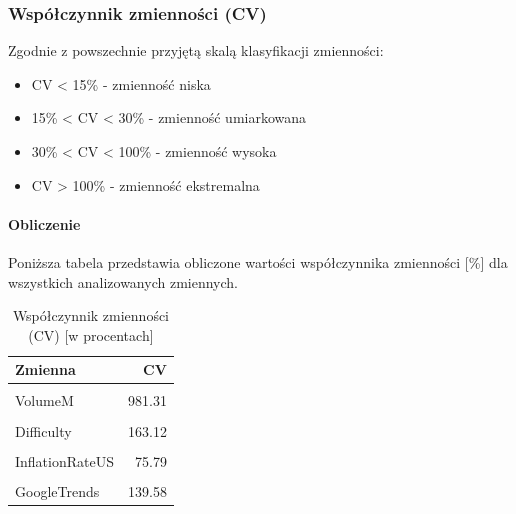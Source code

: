 \documentclass[
  11pt,
]{article}
\providecommand{\tightlist}{%
  \setlength{\itemsep}{0pt}\setlength{\parskip}{0pt}}
\begin{document}
\pagebreak

\subsubsection{Współczynnik zmienności
(CV)}\label{wspuxf3ux142czynnik-zmiennoux15bci-cv}

Zgodnie z powszechnie przyjętą skalą klasyfikacji zmienności:

\begin{itemize}
\tightlist
\item
  CV \textless{} 15\% - zmienność niska
\item
  15\% \textless{} CV \textless{} 30\% - zmienność umiarkowana
\item
  30\% \textless{} CV \textless{} 100\% - zmienność wysoka
\item
  CV \textgreater{} 100\% - zmienność ekstremalna
\end{itemize}

\paragraph{\texorpdfstring{Obliczenie
\newline}{Obliczenie }}\label{obliczenie-1}

Poniższa tabela przedstawia obliczone wartości współczynnika zmienności
{[}\%{]} dla wszystkich analizowanych zmiennych.

\begin{table}[!h]
\centering
\caption{\label{tab:cv_table}Współczynnik zmienności (CV) [w procentach]}
\centering
\begin{tabular}[t]{lr}
\toprule
Zmienna & CV\\
\midrule
\cellcolor{gray!10}{Price} & \cellcolor{gray!10}{148.50}\\
VolumeM & 981.31\\
\cellcolor{gray!10}{USAvgKWHPrice} & \cellcolor{gray!10}{10.86}\\
Difficulty & 163.12\\
\cellcolor{gray!10}{BTCCirculation} & \cellcolor{gray!10}{28.70}\\
\addlinespace
InflationRateUS & 75.79\\
\cellcolor{gray!10}{HasMuskMentioned} & \cellcolor{gray!10}{342.40}\\
GoogleTrends & 139.58\\
\bottomrule
\end{tabular}
\end{table}
\end{document}
